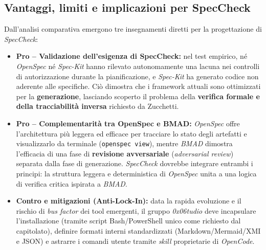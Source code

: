 \documentclass[a4paper, 11pt]{article}
\begin{document}
\subsection{Vantaggi, limiti e implicazioni per SpecCheck}
Dall'analisi comparativa emergono tre insegnamenti diretti per la progettazione di \textit{SpecCheck}:
\begin{itemize}[noitemsep]
    \item \textbf{Pro -- Validazione dell'esigenza di SpecCheck:} nel test empirico, né \textit{OpenSpec} né \textit{Spec-Kit} hanno rilevato autonomamente una lacuna nei controlli di autorizzazione durante la pianificazione, e \textit{Spec-Kit} ha generato codice non aderente alle specifiche. Ciò dimostra che i framework attuali sono ottimizzati per la \textbf{generazione}, lasciando scoperto il problema della \textbf{verifica formale e della tracciabilità inversa} richiesto da Zucchetti.
    \item \textbf{Pro -- Complementarità tra OpenSpec e BMAD:} \textit{OpenSpec} offre l'architettura più leggera ed efficace per tracciare lo stato degli artefatti e visualizzarlo da terminale (\texttt{openspec view}), mentre \textit{BMAD} dimostra l'efficacia di una fase di \textbf{revisione avversariale} (\textit{adversarial review}) separata dalla fase di generazione. \textit{SpecCheck} dovrebbe integrare entrambi i principi: la struttura leggera e deterministica di \textit{OpenSpec} unita a una logica di verifica critica ispirata a \textit{BMAD}.
    \item \textbf{Contro e mitigazioni (Anti-Lock-In):} data la rapida evoluzione e il rischio di \textit{bus factor} dei tool emergenti, il gruppo \textit{0x06tudio} deve incapsulare l'installazione (tramite script Bash/PowerShell unico come richiesto dal capitolato), definire formati interni standardizzati (Markdown/Mermaid/XMI e JSON) e astrarre i comandi utente tramite \textit{skill} proprietarie di \textit{OpenCode}.
\end{itemize}
\end{document}

